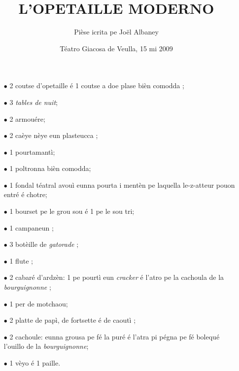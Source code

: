 \title{L’OPETAILLE MODERNO}
\author{Pièse icrita pe Jo\"{e}l Albaney}
\date{Téatro Giacosa de Veulla, 15 mi 2009}

\maketitle

\label{link}





\Scenographie
\begin{itemize}
\item[$\bullet$] 2 coutse d'opetaille é 1 coutse a doe plase bièn comodda  ;
\item[$\bullet$] 3 \textit{tables de nuit};
\item[$\bullet$] 2 armouére;
\item[$\bullet$] 2 caèye nèye eun plasteucca ;
\item[$\bullet$] 1 pourtamantì;
\item[$\bullet$] 1 poltronna bièn comodda;
\item[$\bullet$] 1 fondal téatral avouì eunna pourta i mentèn pe laquella le-z-atteur pouon entré é chotre;
\item[$\bullet$] 1 bourset pe le grou sou é 1 pe le sou tri;
\item[$\bullet$] 1 campaneun \campanellino ;
\item[$\bullet$] 3 botèille de \textit{gatorade} ;
\item[$\bullet$] 1 flute ;
\item[$\bullet$] 2 cabaré d’ardzèn: 1 pe pourtì eun \textit{cracker} é l'atro pe la cachoula de la \textit{bourguignonne} ;
\item[$\bullet$] 1 per de motchaou;
\item[$\bullet$] 2 platte de papì, de fortsette é de caoutì \posate ;
\item[$\bullet$] 2 cachoule: eunna grousa pe fé la puré é l'atra pi pégna pe fé bolequé  l'ouillo de la \textit{bourguignonne};
\item[$\bullet$] 1 vèyo é 1 paille.
\end{itemize}


